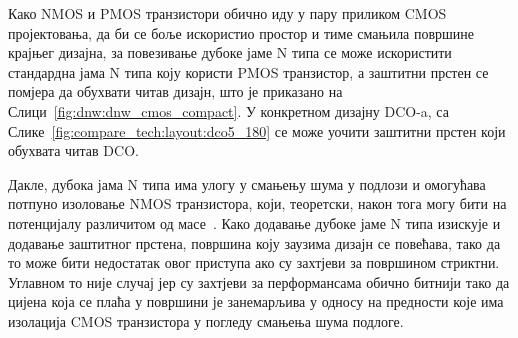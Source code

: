 \documentclass[master]{finthesis}
\def \DCO  {DCO} %
\begin{document}

Како NMOS и PMOS транзистори обично иду у пару приликом CMOS пројектовања, да би се боље искористио простор и тиме смањила површине крајњег дизајна, за повезивање дубоке јаме N типа се може искористити стандардна јама N типа коју користи PMOS транзистор, а заштитни прстен се помјера да обухвати читав дизајн, што је приказано на Слици~\ref{fig:dnw:dnw_cmos_compact}. У конкретном дизајну \DCO-a, са Слике~\ref{fig:compare_tech:layout:dco5_180} се може уочити заштитни прстен који обухвата читав \DCO. \par

Дакле, дубока јама N типа има улогу у смањењу шума у подлози и омогућава потпуно изоловање NMOS транзистора, који, теоретски, након тога могу бити на потенцијалу различитом од масе~\cite{DNW:aspencore}. Како додавање дубоке јаме N типа изискује и додавање заштитног прстена, површина коју заузима дизајн се повећава, тако да то може бити недостатак овог приступа ако су захтјеви за површином стриктни. Углавном то није случај јер су захтјеви за перформансама обично битнији тако да цијена која се плаћа у површини је занемарљива у односу на предности које има изолација CMOS транзистора у погледу смањења шума подлоге.
\end{document}
